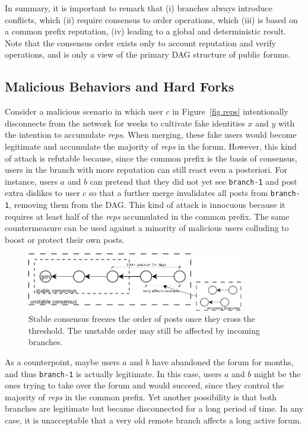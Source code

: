 \documentclass[12pt]{article}
\newcommand{\reps}     {\emph{reps}\xspace}
\newcommand{\code}[1]  {\texttt{\footnotesize{#1}}}
\begin{document}
In summary, it is important to remark that
    (i) branches always introduce conflicts, which
    (ii) require consensus to order operations, which
    (iii) is based on a common prefix reputation,
    (iv) leading to a global and deterministic result.
%
Note that the consensus order exists only to account reputation and verify
operations, and is only a view of the primary DAG structure of public forums.

\subsection{Malicious Behaviors and Hard Forks}
\label{sec.design.hard}

Consider a malicious scenario in which user $c$ in Figure~\ref{fig.reps}
intentionally disconnects from the network for weeks to cultivate fake
identities $x$ and $y$ with the intention to accumulate \reps.
When merging, these fake users would become legitimate and accumulate the
majority of \reps in the forum.
%
However, this kind of attack is refutable because, since the common prefix is
the basis of consensus, users in the branch with more reputation can still
react even a posteriori.
For instance, users $a$ and $b$ can pretend that they did not yet see
\code{branch-1} and post extra dislikes to user $c$ so that a further merge
invalidates all posts from \code{branch-1}, removing them from the DAG.
%
This kind of attack is innocuous because it requires at least half of the \reps
accumulated in the common prefix.
%
The same countermeasure can be used against a minority of malicious users
colluding to boost or protect their own posts.

\begin{figure}
\centering
\includegraphics[width=0.85\textwidth]{n100-d7.png}
\caption{
    Stable consensus freezes the order of posts once they cross the threshold.
    The unstable order may still be affected by incoming branches.
}
\label{fig.hard}
\end{figure}

As a counterpoint, maybe users $a$ and $b$ have abandoned the forum for months,
and thus \code{branch-1} is actually legitimate.
In this case, users $a$ and $b$ might be the ones trying to take over the
forum and would succeed, since they control the majority of \reps in the common
prefix.
Yet another possibility is that both branches are legitimate but became
disconnected for a long period of time.
In any case, it is unacceptable that a very old remote branch affects a long
active forum.
\end{document}
